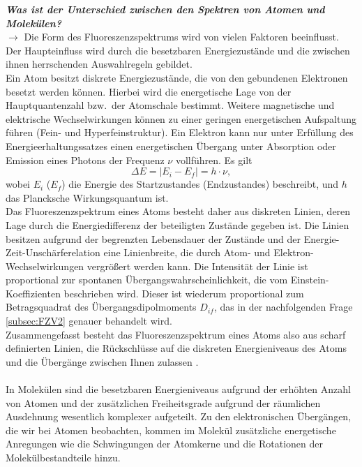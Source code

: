 \textbf{\textit{Was ist der Unterschied zwischen den Spektren von Atomen und Molekülen?}} \\
$\rightarrow$
Die Form des Fluoreszenzspektrums wird von vielen Faktoren beeinflusst.
Der Haupteinfluss wird durch die besetzbaren Energiezustände und die zwischen ihnen herrschenden
Auswahlregeln gebildet. \\
Ein Atom besitzt diskrete Energiezustände, die von den gebundenen Elektronen besetzt werden können.
Hierbei wird die energetische Lage von der Hauptquantenzahl bzw.~der Atomschale bestimmt.
Weitere magnetische und elektrische Wechselwirkungen können zu einer geringen energetischen
Aufspaltung führen (Fein- und Hyperfeinstruktur).
Ein Elektron kann nur unter Erfüllung des Energieerhaltungssatzes einen energetischen Übergang
unter Absorption oder Emission eines Photons der Frequenz $\nu$ vollführen. Es gilt
\begin{equation}
    \Delta{E} = \left\vert E_{i} - E_{f}\right\vert = h\cdot\nu,
\end{equation}
wobei $E_{i}$ ($E_{f}$) die Energie des Startzustandes (Endzustandes) beschreibt, und $h$ das
Plancksche Wirkungsquantum ist. \\
Das Fluoreszenzspektrum eines Atoms besteht daher aus diskreten Linien,
deren Lage durch die Energiedifferenz der beteiligten Zustände gegeben ist.
Die Linien besitzen aufgrund der begrenzten Lebensdauer der Zustände und der
Energie-Zeit-Unschärferelation eine Linienbreite, die durch Atom- und
Elektron-Wechselwirkungen vergrößert werden kann.
Die Intensität der Linie ist proportional zur spontanen Übergangswahrscheinlichkeit,
die vom Einstein-Koeffizienten beschrieben wird.
Dieser ist wiederum proportional zum Betragsquadrat des Übergangsdipolmoments $D_{if}$,
das in der nachfolgenden Frage \ref{subsec:FZV2} genauer behandelt wird. \\
Zusammengefasst besteht das Fluoreszenzspektrum eines Atoms also aus scharf definierten
Linien, die Rückschlüsse auf die diskreten Energieniveaus des Atoms und die Übergänge zwischen
Ihnen zulassen \cite{Demtroder,EPC}. \\ \\
In Molekülen sind die besetzbaren Energieniveaus aufgrund der erhöhten Anzahl von
Atomen und der zusätzlichen Freiheitsgrade aufgrund der räumlichen Ausdehnung
wesentlich komplexer aufgeteilt.
Zu den elektronischen Übergängen, die wir bei Atomen beobachten,
kommen im Molekül zusätzliche energetische Anregungen wie die Schwingungen
der Atomkerne und die Rotationen der Molekülbestandteile hinzu.
